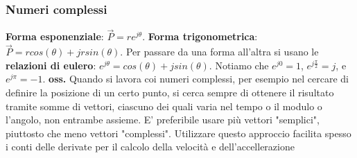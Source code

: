 \subsubsection{Numeri complessi}
\textbf{Forma esponenziale}: $\vec{P} = r e^{j \theta}$.\newline
\textbf{Forma trigonometrica}: $\vec{P} = r cos(\theta) + j r sin(\theta)$.\newline
\newline
Per passare da una forma all'altra si usano le \textbf{relazioni di eulero}: $e^{j \theta} = cos(\theta) + j sin(\theta)$.\newline
\newline
Notiamo che $e^{j 0} = 1$, $e^{j \frac{\pi}{2}} = j$, e $e^{j \pi} = -1$.\newline
\newline
\textbf{oss.} Quando si lavora coi numeri complessi, per esempio nel cercare di definire la posizione di un certo punto, si cerca sempre di ottenere il risultato tramite somme di vettori, ciascuno dei quali varia nel tempo o il modulo o l'angolo, non entrambe assieme. E' preferibile usare più vettori "semplici", piuttosto che meno vettori "complessi". Utilizzare questo approccio facilita spesso i conti delle derivate per il calcolo della velocità e dell'accellerazione